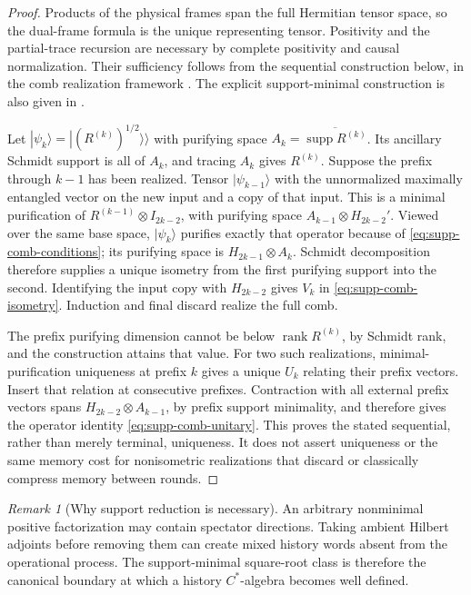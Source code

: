 \documentclass[11pt]{article}
\numberwithin{equation}{section}
\theoremstyle{definition}
\theoremstyle{remark}
\newtheorem{remark}[remark]{Remark}
\newcommand{\rank}{\operatorname{rank}}
\newcommand{\supp}{\operatorname{supp}}
\begin{document}
\begin{proof}
Products of the physical frames span the full Hermitian tensor space, so
the dual-frame formula is the unique representing tensor. Positivity and
the partial-trace recursion are necessary by complete positivity and causal
normalization. Their sufficiency follows from the sequential construction
below, in the comb realization framework \cite{Chiribella2009}. The explicit
support-minimal construction is also given in \cite[Theorem~2]{Bisio2011}.

Let $|\psi_k\rangle=|(R^{(k)})^{1/2}\rangle\!\rangle$ with purifying
space $A_k=\overline{\supp R^{(k)}}$.  Its ancillary Schmidt support is
all of $A_k$, and tracing $A_k$ gives $R^{(k)}$.  Suppose the prefix through
$k-1$ has been realized. Tensor $|\psi_{k-1}\rangle$ with the unnormalized
maximally entangled vector on the new input and a copy of that input.
This is a minimal purification of
$R^{(k-1)}\otimes I_{2k-2}$, with purifying space
$A_{k-1}\otimes H_{2k-2}'$. Viewed over the same base space,
$|\psi_k\rangle$ purifies exactly that operator because of
\eqref{eq:supp-comb-conditions}; its purifying space is
$H_{2k-1}\otimes A_k$. Schmidt decomposition therefore supplies a unique
isometry from the first purifying support into the second. Identifying the
input copy with $H_{2k-2}$ gives $V_k$ in
\eqref{eq:supp-comb-isometry}. Induction and final discard realize the full
comb.

The prefix purifying dimension cannot be below $\rank R^{(k)}$, by Schmidt
rank, and the construction attains that value. For two such realizations,
minimal-purification uniqueness at prefix $k$ gives a unique $U_k$ relating
their prefix vectors. Insert that relation at consecutive prefixes.
Contraction with all external prefix vectors spans
$H_{2k-2}\otimes A_{k-1}$, by prefix support minimality, and therefore
gives the operator identity \eqref{eq:supp-comb-unitary}. This proves the
stated sequential, rather than merely terminal, uniqueness. It does not
assert uniqueness or the same memory cost for nonisometric realizations
that discard or classically compress memory between rounds.
\end{proof}

\begin{remark}[Why support reduction is necessary]
An arbitrary nonminimal positive factorization may contain spectator
directions.  Taking ambient Hilbert adjoints before removing them can create
mixed history words absent from the operational process.  The support-minimal
square-root class is therefore the canonical boundary at which a history
$C^*$-algebra becomes well defined.
\end{remark}
\end{document}
